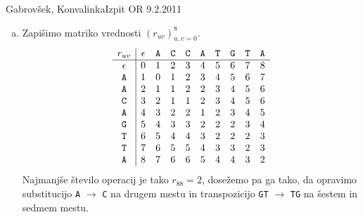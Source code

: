 \begin{naloga}{Gabrovšek, Konvalinka}{Izpit OR 9.2.2011}
\begin{odgovor}
\begin{enumerate}[(a)]
\item Zapišimo matriko vrednosti $(r_{uv})_{u,v=0}^8$.
$$
\begin{array}{c|ccccccccc}
r_{uv} & \epsilon & \text{\tt A} & \text{\tt C} & \text{\tt C} & \text{\tt A} & \text{\tt T} & \text{\tt G} & \text{\tt T} & \text{\tt A} \\ \hline
\epsilon     & 0 & 1 & 2 & 3 & 4 & 5 & 6 & 7 & 8 \\
\text{\tt A} & 1 & 0 & 1 & 2 & 3 & 4 & 5 & 6 & 7 \\
\text{\tt A} & 2 & 1 & 1 & 2 & 2 & 3 & 4 & 5 & 6 \\
\text{\tt C} & 3 & 2 & 1 & 1 & 2 & 3 & 4 & 5 & 6 \\
\text{\tt A} & 4 & 3 & 2 & 2 & 1 & 2 & 3 & 4 & 5 \\
\text{\tt G} & 5 & 4 & 3 & 3 & 2 & 2 & 2 & 3 & 4 \\
\text{\tt T} & 6 & 5 & 4 & 4 & 3 & 2 & 2 & 2 & 3 \\
\text{\tt T} & 7 & 6 & 5 & 5 & 4 & 3 & 3 & 2 & 3 \\
\text{\tt A} & 8 & 7 & 6 & 6 & 5 & 4 & 4 & 3 & 2
\end{array}
$$
Najmanjše število operacij je tako $r_{88} = 2$, dosežemo pa ga tako,
da opravimo substitucijo {\tt A} $\to$ {\tt C} na drugem mestu
in transpozicijo {\tt GT} $\to$ {\tt TG} na šestem in sedmem mestu.
\end{enumerate}
\end{odgovor}
\end{naloga}
